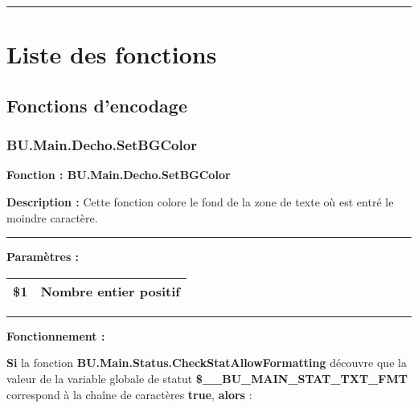\documentclass[a4paper,10pt]{article}
\begin{document}


\color{sec1}\par\noindent\rule{\textwidth}{0.4pt}\color{text}

\color{sec1}
\section{Liste des fonctions}\color{text}

\color{sec2}
\subsection{Fonctions d'encodage}\color{text}

\color{sec3}
\subsubsection{BU.Main.Decho.SetBGColor}\color{text}

\begin{justify}
    \textbf{Fonction : \color{func}BU.Main.Decho.SetBGColor}
\end{justify}

\setlength{\parskip}{1em}

\begin{justify}
    \textbf{Description :} Cette fonction colore le fond de la zone de texte où est entré le moindre caractère.
\end{justify}


\par\noindent\rule{\textwidth}{0.4pt}

\begin{justify}
    \textbf{Paramètres :}

    \begin{tabular}{|l|l|}
        \hline
        \textbf{\color{orange}\$1} & Nombre entier positif\\
        \hline
    \end{tabular}
\end{justify}


\par\noindent\rule{\textwidth}{0.4pt}

\begin{justify}
    \textbf{Fonctionnement :}

    \textbf{\color{cond}Si} la fonction \textbf{\color{func}BU.Main.Status.CheckStatAllowFormatting} découvre que la valeur de la variable globale de statut \textbf{\color{vars}\$\_\_BU\_MAIN\_STAT\_TXT\_FMT} correspond à la chaîne de caractères \textbf{true}, \textbf{\color{cond}alors} :
\end{justify}
\end{document}
